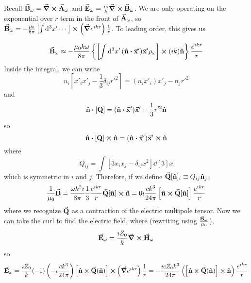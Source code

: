 \documentclass[a4paper,twoside,master.tex]{subfiles}
\begin{document}
Recall $ \va{B}_{\omega} = \curl{ \va{A}_{\omega}} $ and $ \va{E}_{\omega} = \frac{\imath c}{k} \curl{ \va{B}_{\omega}} $. We are only operating on the exponential over $ r $ term in the front of $ \va{A}_{\omega} $, so $ \va{B}_{\omega} = -\frac{\mu_0}{8 \pi} \left[ \int \dd[3]{x'}\cdots \right] \cross \left( \grad{e^{\imath kr}} \right) \frac{1}{r} $. To leading order, this gives us

\begin{equation}
    \va{B}_{\omega} \approx -\frac{\mu_0 k \omega}{8 \pi} \left\{ \left[ \int \dd[3]{x'}( \vu{n} \vdot \va{x}') \va{x}' \rho_{\omega} \right] \cross (\imath k) \vu{n} \right\} \frac{e^{\imath kr}}{r}
\end{equation}
Inside the integral, we can write
\begin{equation}
    n_i \left[x'_i x'_j - \frac{1}{3} \delta_{ij} r'^2 \right] = (n_i x'_i)x'_j - n_j r'^2
\end{equation}
and
\begin{equation}
    \vu{n} \vdot [ \vb{Q} ] = ( \vu{n} \vdot \va{x}') \va{x}' - \frac{1}{3} r'^2 \vu{n}
\end{equation}
so
\begin{equation}
    \vu{n} \vdot [ \vb{Q} ] \cross \vu{n} = ( \vu{n} \vdot \va{x}') \va{x}' \cross \vu{n}
\end{equation}
where
\begin{equation}
    Q_{ij} = \int \left[ 3 x_i x_j - \delta_{ij} x^2 \right] \dd[3]{x}
\end{equation}
which is symmetric in $ i $ and $ j $. Therefore, if we define $ \va{Q}[ \vu{n} ]_i \equiv Q_{ij} \vu{n}_j $,
\begin{equation}
    \frac{1}{\mu_0} \va{B} = \frac{\omega k^2 \imath}{8 \pi} \frac{1}{3} \frac{e^{\imath kr}}{r} \va{Q} [ \vu{n}] \cross \vu{n} = 0 \imath\frac{c k^3}{24 \pi} \left[ \vu{n} \cross \va{Q} [ \vu{n}] \right] \frac{e^{\imath kr}}{r} 
\end{equation}
where we recognize $ \va{Q} $ as a contraction of the electric multipole tensor. Now we can take the curl to find the electric field, where (rewriting using $ \frac{\va{B}_{\omega}}{\mu_0} $),
\begin{equation}
    \va{E}_{\omega} = \frac{\imath Z_0}{k} \curl{ \va{H}_{\omega}}
\end{equation}
so
\begin{equation}
    \va{E}_{\omega} = \frac{\imath Z_0}{k} (-1)\left( - \imath \frac{c k^3}{24 \pi} \right) \left[ \vu{n} \cross \va{Q}( \vu{n}) \right] \cross \left( \grad{e^{\imath kr}} \right) \frac{1}{r} = - \frac{\imath c Z_0 k^3}{24 \pi}\left( \left[ \vu{n} \cross \va{Q}( \vu{n}) \right] \cross \vu{n}\right) \frac{e^{\imath kr}}{r}
\end{equation}
\end{document}
